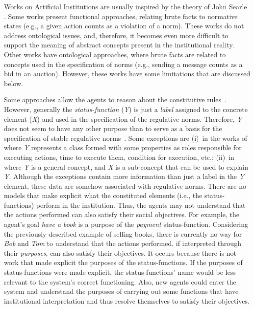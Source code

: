 \documentclass[runningheads]{llncs}
\begin{document}
Works on Artificial Institutions are usually inspired by the theory of John Searle \cite{searle1995construction,searle2010making}. Some works present functional approaches, relating brute facts to normative states (e.g., a given action counts as a violation of a norm). These works do not address ontological issues, and, therefore, it becomes even more difficult to support the meaning of abstract concepts present in the institutional reality. Other works have ontological approaches, where brute facts are related to concepts used in the specification of norms (e.g., sending a message counts as a bid in an auction). However, these works have some limitations that are discussed below.

Some approaches allow the agents to reason about the constitutive rules~\cite{cliffe2006specifying,fornara2011specifying,brito2016model,CARDOSO2007,Vigano2008,aldewereld2010making}. However, generally the \emph{status-function} (\emph{Y}) is just a \textit{label} assigned to the concrete element (\emph{X}) and used in the specification of the regulative norms. Therefore, \emph{Y} does not seem to have any other purpose than to serve as a basis for the specification of stable regulative norms~\cite{vazquez2008human,aldewereld2010making}.
Some exceptions are (i)~in the works of \cite{fornara2009ontology,fornara2010representation,fornara2011specifying,fornara2012using} where \emph{Y} represents a class formed with some properties as roles responsible for executing actions, time to execute them, condition for execution, etc.; (ii)~in~\cite{vazquez2008human} where \emph {Y} is a general concept, and \emph {X} is a sub-concept that can be used to explain \emph{Y}. %
Although the exceptions contain more information than just a label in the \emph {Y} element, these data are somehow associated with regulative norms.
There are no models that make explicit what the constituted elements (i.e., the status-functions) perform in the institution.
Thus, the agents may not understand that the actions performed can also satisfy their social objectives.
For example, the agent's goal \emph {have a book} is a purpose of the \emph{payment} status-function. Considering the previously described example of selling books, there is currently no way for \emph{Bob} and \emph{Tom} to understand that the actions performed, if interpreted through their \emph{purposes}, can also satisfy their objectives. 
It occurs because there is not work that made explicit the purposes of the status-functions.
If the purposes of status-functions were made explicit, the status-functions' name would be less relevant to the system's correct functioning. Also, new agents could enter the system and understand the purposes of carrying out some functions that have institutional interpretation and thus resolve themselves to satisfy their objectives.
\end{document}
